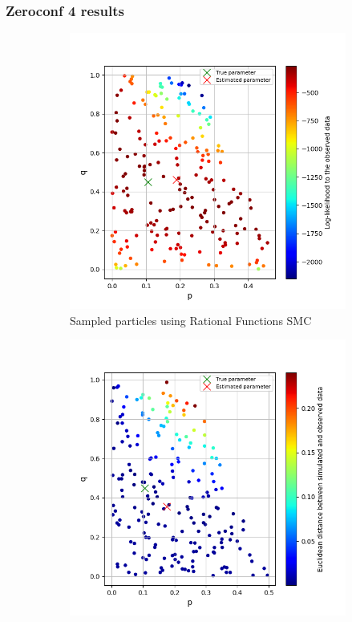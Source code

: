 \documentclass{beamer}
\begin{document}
\begin{frame}
    \frametitle{Zeroconf 4 results}
    \begin{figure}[H]
        \centering
        \begin{subfigure}{0.48\textwidth}
            \centering
            \includegraphics[width=\linewidth]{figures/zeroconf4_rf.png}
            \caption{Sampled particles using Rational Functions SMC}
        \end{subfigure}
        \hfill
        \begin{subfigure}{0.48\textwidth}
            \centering
            \includegraphics[width=\linewidth]{figures/zeroconf4_sim.png}

\end{subfigure}
\end{figure}
\end{frame}
\end{document}
